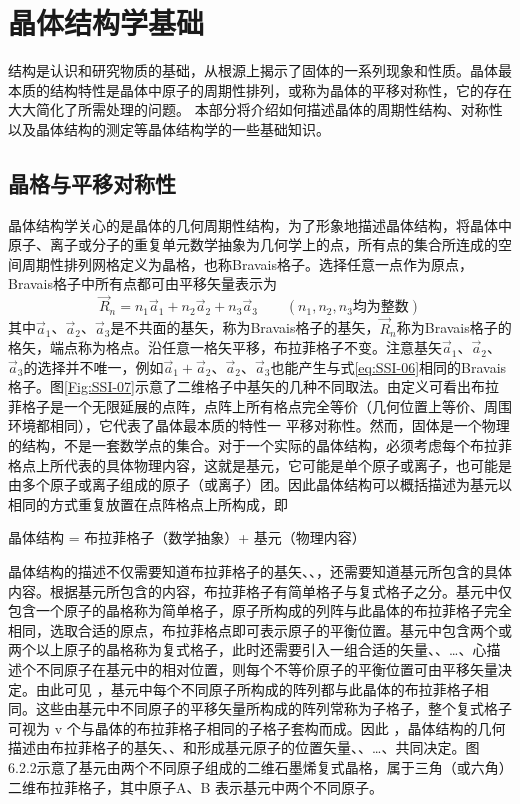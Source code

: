 \section{晶体结构学基础}
结构是认识和研究物质的基础，从根源上揭示了固体的一系列现象和性质。晶体最本质的结构特性是晶体中原子的周期性排列，或称为晶体的平移对称性，它的存在大大简化了所需处理的问题。%
本部分将介绍如何描述晶体的周期性结构、对称性以及晶体结构的测定等晶体结构学的一些基础知识。

\subsection{晶格与平移对称性}
晶体结构学关心的是晶体的几何周期性结构，为了形象地描述晶体结构，将晶体中原子、离子或分子的重复单元数学抽象为几何学上的点，所有点的集合所连成的空间周期性排列网格定义为晶格，也称Bravais格子。选择任意一点作为原点，Bravais格子中所有点都可由平移矢量表示为
\begin{equation}
	\vec R_n=n_1\vec a_1+n_2\vec a_2+n_3\vec a_3\qquad (n_1,n_2,n_3\mbox{均为整数})
	\label{eq:SSI-06}
\end{equation}
其中$\vec a_1$、$\vec a_2$、$\vec a_3$是不共面的基矢，称为Bravais格子的基矢，$\vec R_n$称为Bravais格子的格矢，端点称为格点。沿任意一格矢平移，布拉菲格子不变。注意基矢$\vec a_1$、$\vec a_2$、$\vec a_3$的选择并不唯一，例如$\vec a_1+\vec a_2$、$\vec a_2$、$\vec a_3$也能产生与式\eqref{eq:SSI-06}相同的Bravais格子。图\ref{Fig:SSI-07}示意了二维格子中基矢的几种不同取法。由定义可看出布拉菲格子是一个无限延展的点阵，点阵上所有格点完全等价（几何位置上等价、周围环境都相同），它代表了晶体最本质的特性一 平移对称性。然而，固体是一个物理的结构，不是一套数学点的集合。对于一个实际的晶体结构，必须考虑每个布拉菲格点上所代表的具体物理内容，这就是基元，它可能是单个原子或离子，也可能是由多个原子或离子组成的原子（或离子）团。因此晶体结构可以概括描述为基元以相同的方式重复放置在点阵格点上所构成，即

晶体结构 = 布拉菲格子（数学抽象）+ 基元（物理内容）

晶体结构的描述不仅需要知道布拉菲格子的基矢、、，还需要知道基元所包含的具体内容。根据基元所包含的内容，布拉菲格子有简单格子与复式格子之分。基元中仅包含一个原子的晶格称为简单格子，原子所构成的列阵与此晶体的布拉菲格子完全相同，选取合适的原点，布拉菲格点即可表示原子的平衡位置。基元中包含两个或两个以上原子的晶格称为复式格子，此时还需要引入一组合适的矢量、、…、心描述个不同原子在基元中的相对位置，则每个不等价原子的平衡位置可由平移矢量决定。由此可见 ，基元中每个不同原子所构成的阵列都与此晶体的布拉菲格子相同。这些由基元中不同原子的平移矢量所构成的阵列常称为子格子，整个复式格子可视为 v 个与晶体的布拉菲格子相同的子格子套构而成。因此 ，晶体结构的几何描述由布拉菲格子的基矢、、和形成基元原子的位置矢量、、…、共同决定。图 6.2.2示意了基元由两个不同原子组成的二维石墨烯复式晶格，属于三角（或六角）二维布拉菲格子，其中原子A、B 表示基元中两个不同原子。




